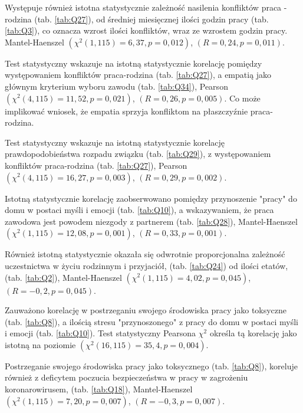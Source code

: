 \documentclass[a4paper,12pt,twoside,openright]{mwrep}
\begin{document}

	Występuje również  istotna statystycznie zależność nasilenia konfliktów praca - rodzina (tab. \ref{tab:Q27}), od średniej miesięcznej ilości godzin pracy (tab. \ref{tab:Q3}), co oznacza wzrost ilości konfliktów, wraz ze wzrostem godzin pracy.
Mantel-Haenszel $(\chi^2 (1, 115) = 6,37, p=0,012)$, $(R = 0,24, p = 0,011)$.

	Test statystyczny wskazuje na istotną statystycznie korelację pomiędzy występowaniem konfliktów praca-rodzina (tab. \ref{tab:Q27}), a empatią jako głównym kryterium wyboru zawodu  (tab. \ref{tab:Q34}), Pearson $(\chi^2 (4, 115) = 11,52, p=0,021)$, $(R = 0,26, p = 0,005)$. Co może implikować wniosek, że empatia sprzyja konfliktom na płaszczyźnie praca-rodzina.

	Test statystyczny wskazuje na istotną statystycznie korelację prawdopodobieństwa rozpadu związku  (tab. \ref{tab:Q29}), z występowaniem konfliktów praca-rodzina  (tab. \ref{tab:Q27}), Pearson $(\chi^2 (4, 115) = 16,27, p=0,003)$, $(R = 0,29, p = 0,002)$.
	
	Istotną statystycznie korelację zaobserwowano pomiędzy przynoszenie "pracy" do domu w postaci myśli i emocji  (tab. \ref{tab:Q10}), a wskazywaniem, że praca zawodowa jest powodem niezgody z partnerem  (tab. \ref{tab:Q28}), Mantel-Haenszel $(\chi^2 (1, 115) = 12,08, p=0,001)$, $(R = 0,33, p = 0,001)$.

Również istotną statystycznie okazała się odwrotnie proporcjonalna zależność uczestnictwa w życiu rodzinnym i przyjaciół, (tab. \ref{tab:Q24}) od ilości etatów, (tab. \ref{tab:Q2}), Mantel-Haenszel $(\chi^2 (1, 115) = 4,02, p=0,045)$, $(R = -0,2, p = 0,045)$. 
	

Zauważono  korelację w postrzeganiu swojego środowiska pracy jako toksyczne (tab. \ref{tab:Q8}), a ilością stresu "przynoszonego" z pracy do domu w postaci myśli i emocji (tab. \ref{tab:Q10}). Test statystyczny Pearsona $\chi^2$ określa tą korelację jako istotną na poziomie $(\chi^2 (16, 115) = 35,4, p = 0,004)$.

Postrzeganie swojego środowiska pracy jako toksycznego (tab. \ref{tab:Q8}), koreluje również z deficytem poczucia bezpieczeństwa w pracy w zagrożeniu koronarowirusem, (tab. \ref{tab:Q18}), Mantel-Haenszel $(\chi^2 (1, 115) = 7,20, p=0,007)$, $(R = -0,3, p = 0,007)$. 
\end{document}
